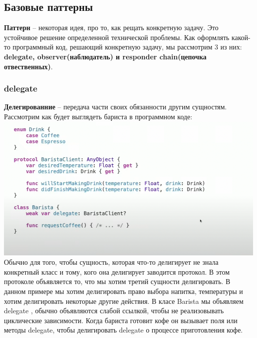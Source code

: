 \documentclass{article}
\begin{document}
    \subsection{Базовые паттерны}
    \textbf{Паттерн } -- некоторая идея, про то, как рещать конкретную задачу. Это устойчивое решение определенной технической проблемы. 
    \newline
    Как оформлять какой-то программный код, решающий конкретную задачу, мы рассмотрим 3 из них: \textbf{delegate, observer(наблюдатель) и responder chain(цепочка отвественных)}. 
    \subsubsection{delegate}
    \textbf{Делегированние} -- передача части своих обязанности другим сущностям. Рассмотрим как будет выглядеть бариста в программном коде: 
    \newline
    \includegraphics[scale = 0.5]{pic/Снимок экрана 2023-07-29 в 14.54.36.png}
    \newline
    Обычно для того, чтобы сущность, которая что-то делигирует не знала конкретный класс и тому, кого она делигирует заводится протокол. В этом протоколе объявляется то, что мы хотим третий сущности делигировать. В данном примере мы хотим делигировать право выбора напитка, температуры и хотим делигировать некоторые другие действия. В класе Barista мы объявляем delegate , обычно объявляются слабой ссылкой, чтобы не реализовывать циклические зависимости. Когда бариста готовит кофе он вызывает поля или методы delegate, чтобы делигировать delegate о процессе приготовления кофе. 
\end{document}
